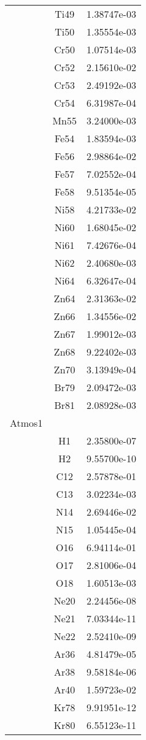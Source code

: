 \begin{centering}
\begin{longtable}{l c c}
& Ti49 & 1.38747e-03 \\ 
& Ti50 & 1.35554e-03 \\ 
& Cr50 & 1.07514e-03 \\ 
& Cr52 & 2.15610e-02 \\ 
& Cr53 & 2.49192e-03 \\ 
& Cr54 & 6.31987e-04 \\ 
& Mn55 & 3.24000e-03 \\ 
& Fe54 & 1.83594e-03 \\ 
& Fe56 & 2.98864e-02 \\ 
& Fe57 & 7.02552e-04 \\ 
& Fe58 & 9.51354e-05 \\ 
& Ni58 & 4.21733e-02 \\ 
& Ni60 & 1.68045e-02 \\ 
& Ni61 & 7.42676e-04 \\ 
& Ni62 & 2.40680e-03 \\ 
& Ni64 & 6.32647e-04 \\ 
& Zn64 & 2.31363e-02 \\ 
& Zn66 & 1.34556e-02 \\ 
& Zn67 & 1.99012e-03 \\ 
& Zn68 & 9.22402e-03 \\ 
& Zn70 & 3.13949e-04 \\ 
& Br79 & 2.09472e-03 \\ 
& Br81 & 2.08928e-03 \\ 
\hline
Atmos1 & & \\
\hline
& H1 & 2.35800e-07 \\ 
& H2 & 9.55700e-10 \\ 
& C12 & 2.57878e-01 \\ 
& C13 & 3.02234e-03 \\ 
& N14 & 2.69446e-02 \\ 
& N15 & 1.05445e-04 \\ 
& O16 & 6.94114e-01 \\ 
& O17 & 2.81006e-04 \\ 
& O18 & 1.60513e-03 \\ 
& Ne20 & 2.24456e-08 \\ 
& Ne21 & 7.03344e-11 \\ 
& Ne22 & 2.52410e-09 \\ 
& Ar36 & 4.81479e-05 \\ 
& Ar38 & 9.58184e-06 \\ 
& Ar40 & 1.59723e-02 \\ 
& Kr78 & 9.91951e-12 \\ 
& Kr80 & 6.55123e-11 \\ 

\end{longtable}
\end{centering}
